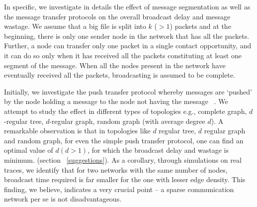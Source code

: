 {In specific, we investigate in details the effect of message segmentation as well as the message transfer protocols on the overall 
broadcast delay and message wastage. 
We assume that a big file is split into $k$ ($>1$) packets and 
at the beginning, there is only one sender node in the network that has all the packets. 
Further, a node can transfer only one  packet in a single contact opportunity, and it can do so only when it has received all the 
packets constituting at least one segment of the message. When all the nodes present in the network have eventually received all the packets, 
broadcasting is assumed to be complete. 

Initially, we investigate the push transfer protocol whereby messages are `pushed'
by the node holding a message to the node not having the message ~\cite{demers1987epidemic,lo2008some}. 
We attempt to study the effect in different types of topologies e.g., complete graph, $d$-regular tree, $d$-regular graph, random graph (with average degree $d$). 
A remarkable observation is that in topologies like $d$ regular tree, $d$ regular graph and random graph,
for even the simple push transfer protocol, one can find an optimal value of $d (d>1)$, for which the broadcast delay and wastage is minimum. (section ~\ref{suggestions}).
As a corollary, through simulations on real traces, we identify that for two networks with the same number of nodes, broadcast 
time required is far smaller for the one with lesser edge density. 
This finding, 
we believe, indicates a very crucial point -- a sparse communication network per se is not disadvantageous. 

}
